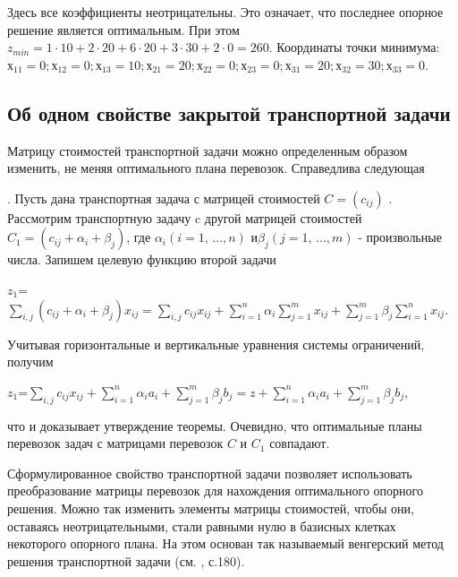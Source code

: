 Здесь все коэффициенты неотрицательны. Это означает, что последнее опорное решение является оптимальным. При этом $z_{min} = 1\cdot10 + 2\cdot20 + 6\cdot20 + 3\cdot30 + 2\cdot0 = 260$.   Координаты   точки  минимума: $х_{11} = 0; х_{12} = 0; х_{13} = 10; х_{21} = 20;  х_{22} = 0; х_{23 }= 0; х_{31} = 20; х_{32} = 30; х_{33} = 0$.





\subsection{Об одном свойстве закрытой транспортной задачи}
Матрицу стоимостей транспортной задачи можно определенным образом изменить, не меняя оптимального плана перевозок. Справедлива следующая 

. Пусть дана транспортная задача с матрицей стоимостей $C=(c_{ij})$ . Рассмотрим транспортную задачу c другой матрицей стоимостей $C_1=(c_{ij}+\alpha_i+\beta_j)$, где $\alpha_i(i=1,\,...,n)$ и$\beta_j(j=1,\,...,m)$ - произвольные числа. Запишем целевую функцию второй задачи
\begin{center}
$z{}_{1}$=$\sum _{i,j}(c_{ij} +\alpha _{i} +\beta _{j} )x_{ij} = \sum _{i,j}c_{ij} x_{ij} +\sum _{i=1}^{n}\alpha _{i}  \sum _{j=1}^{m}x_{ij}  +\sum _{j=1}^{m}\beta _{j}  \sum _{i=1}^{n}x_{ij}   $.
\end{center}
Учитывая горизонтальные и вертикальные уравнения системы ограничений, получим
\begin{center}
$z{}_{1}$=$\sum _{i,j}c_{ij} x_{ij} +\sum _{i=1}^{n}\alpha _{i}  a_{i} +\sum _{j=1}^{m}\beta _{j}  b_{j} =z+ \sum _{i=1}^{n}\alpha _{i}  a_{i} +\sum _{j=1}^{m}\beta _{j}  b_{j} $,
\end{center}

что и доказывает утверждение теоремы. Очевидно, что оптимальные планы перевозок задач с матрицами перевозок $C$ и $C{}_{1}$ совпадают.

Сформулированное свойство транспортной задачи позволяет использовать преобразование матрицы перевозок для нахождения оптимального опорного решения. Можно так изменить элементы матрицы стоимостей, чтобы они, оставаясь неотрицательными, стали равными нулю в базисных клетках некоторого опорного плана. На этом основан так называемый венгерский метод решения транспортной задачи (см. \cite{literature_golshtein_1}, с.180).

